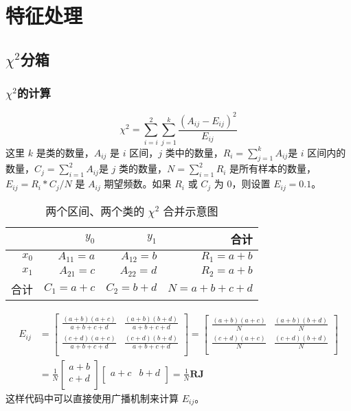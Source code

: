 \chapter{特征处理}
\section{$\chi^2$分箱}
\subsection{$\chi^2$的计算}
\begin{equation}
    \chi^2=\sum_{i=i}^{2}\sum_{j=1}^{k}\frac{(A_{ij}-E_{ij})^2}{E_{ij}}
\end{equation}
这里 $k$ 是类的数量，$A_{ij}$ 是 $i$ 区间，$j$ 类中的数量，$R_i=\sum_{j=1}^{k}A_{ij}$是 $i$ 区间内的数量，$C_j=\sum_{i=1}^{2}A_{ij}$是 $j$ 类的数量，$N=\sum_{i=1}^{2}R_i$ 是所有样本的数量，$E_{ij}=R_i*C_j/N$ 是 $A_{ij}$ 期望频数。如果 $R_i$ 或 $C_j$ 为 0，则设置 $E_{ij}=0.1$。

\begin{table}
    \centering
    \caption{两个区间、两个类的 $\chi^2$ 合并示意图}
    \begin{tabular}{rrrr}
        \hline
              & $y_0$      & $y_1$      & 合计          \\
        \hline
        $x_0$ & $A_{11}=a$ & $A_{12}=b$ & $R_1=a+b$   \\
        $x_1$ & $A_{21}=c$ & $A_{22}=d$ & $R_2=a+b$   \\
        合计    & $C_1=a+c$  & $C_2=b+d$  & $N=a+b+c+d$ \\
        \hline
    \end{tabular}
\end{table}
\begin{equation}
    \begin{aligned}
        E_{ij} & =
        \begin{bmatrix}
            \frac{(a+b)(a+c)}{a+b+c+d} & \frac{(a+b)(b+d)}{a+b+c+d} \\
            \frac{(c+d)(a+c)}{a+b+c+d} & \frac{(c+d)(b+d)}{a+b+c+d} \\
        \end{bmatrix}=\begin{bmatrix}
                          \frac{(a+b)(a+c)}{N} & \frac{(a+b)(b+d)}{N} \\
                          \frac{(c+d)(a+c)}{N} & \frac{(c+d)(b+d)}{N} \\
                      \end{bmatrix} \\
               & =\frac{1}{N}
        \begin{bmatrix}
            a+b \\
            c+d \\
        \end{bmatrix}
        \begin{bmatrix}
            a+c & b+d \\
        \end{bmatrix}=\frac{1}{N}\bm{R}\bm{J}
    \end{aligned}
\end{equation}
这样代码中可以直接使用广播机制来计算 $E_{ij}$。
